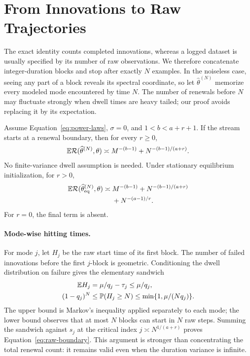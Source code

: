 \section{From Innovations to Raw Trajectories}
\label{sec:raw-horizon}

The exact identity counts completed innovations, whereas a logged dataset is
usually specified by its number of raw observations.  We therefore concatenate
integer-duration blocks and stop after exactly $N$ examples.  In the noiseless
case, seeing any part of a block reveals its spectral coordinate, so let
$\widehat\theta^{(N)}$ memorize every modeled mode encountered by time $N$.
The number of renewals before $N$ may fluctuate strongly when dwell times are
heavy tailed; our proof avoids replacing it by its expectation.

\begin{theorem}
\label{thm:raw}
Assume Equation~\eqref{eq:power-laws}, $\sigma=0$, and
$1<b<a+r+1$.  If the stream starts at a renewal boundary, then for every
$r\ge0$,
\begin{equation}
\mathbb{E}\mathcal{R}(\widehat\theta^{(N)},\theta)
\mathrel{\asymp} M^{-(b-1)}+N^{-(b-1)/(a+r)}.
\label{eq:raw-boundary}
\end{equation}
No finite-variance dwell assumption is needed.  Under stationary equilibrium
initialization, for $r>0$,
\begin{align}
\mathbb{E}\mathcal{R}(\widehat\theta^{(N)}_{\rm eq},\theta)
\mathrel{\asymp}{}&M^{-(b-1)}+N^{-(b-1)/(a+r)}\nonumber\\
&+N^{-(a-1)/r}.
\label{eq:raw-stationary}
\end{align}
For $r=0$, the final term is absent.
\end{theorem}

\paragraph{Mode-wise hitting times.}
For mode $j$, let $H_j$ be the raw start time of its first block.  The number
of failed innovations before the first $j$-block is geometric.  Conditioning
the dwell distribution on failure gives the elementary sandwich
\begin{align}
\mathbb{E} H_j&=\mu/q_j-\tau_j\le\mu/q_j,\nonumber\\
(1-q_j)^N&\le\mathbb{P}(H_j\ge N)
\le\min\{1,\mu/(Nq_j)\}.
\label{eq:hitting-sandwich}
\end{align}
The upper bound is Markov's inequality applied separately to each mode; the
lower bound observes that at most $N$ blocks can start in $N$ raw steps.
Summing the sandwich against $s_j$ at the critical index
$j\asymp N^{1/(a+r)}$ proves Equation~\eqref{eq:raw-boundary}.  This argument is
stronger than concentrating the total renewal count: it remains valid even
when the duration variance is infinite.


